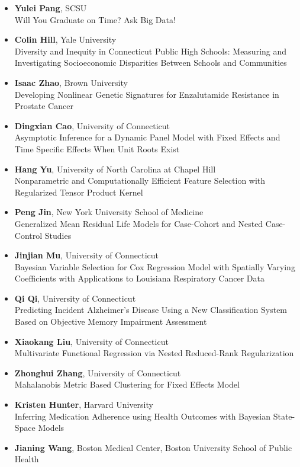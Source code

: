 
\begin{itemize}
\item \textbf{Yulei Pang}, SCSU \\
Will You Graduate on Time? Ask Big Data!
\item \textbf{Colin Hill}, Yale University \\
Diversity and Inequity in Connecticut Public High Schools: Measuring and Investigating Socioeconomic Disparities Between Schools and Communities
\item \textbf{Isaac Zhao}, Brown University \\
Developing Nonlinear Genetic Signatures for Enzalutamide Resistance in Prostate Cancer
\item \textbf{Dingxian Cao}, University of Connecticut \\
Asymptotic Inference for a Dynamic Panel Model with Fixed Effects and Time Specific Effects When Unit Roots Exist
\item \textbf{Hang Yu}, University of North Carolina at Chapel Hill \\
Nonparametric and Computationally Efficient Feature Selection with Regularized Tensor Product Kernel
\item \textbf{Peng Jin}, New York University School of Medicine \\
Generalized Mean Residual Life Models for Case-Cohort and Nested Case-Control Studies
\item \textbf{Jinjian Mu}, University of Connecticut \\
Bayesian Variable Selection for Cox Regression Model with Spatially Varying Coefficients with Applications to Louisiana Respiratory Cancer Data
\item \textbf{Qi Qi}, University of Connecticut \\
Predicting Incident Alzheimer's Disease Using a New Classification System Based on Objective Memory Impairment Assessment
\item \textbf{Xiaokang Liu}, University of Connecticut \\
Multivariate Functional Regression via Nested Reduced-Rank Regularization
\item \textbf{Zhonghui Zhang}, University of Connecticut \\
Mahalanobis Metric Based Clustering for Fixed Effects Model
\item \textbf{Kristen Hunter}, Harvard University \\
Inferring Medication Adherence using Health Outcomes with Bayesian State-Space Models
\item \textbf{Jianing Wang}, Boston Medical Center, Boston University School of Public Health \\

\end{itemize}
